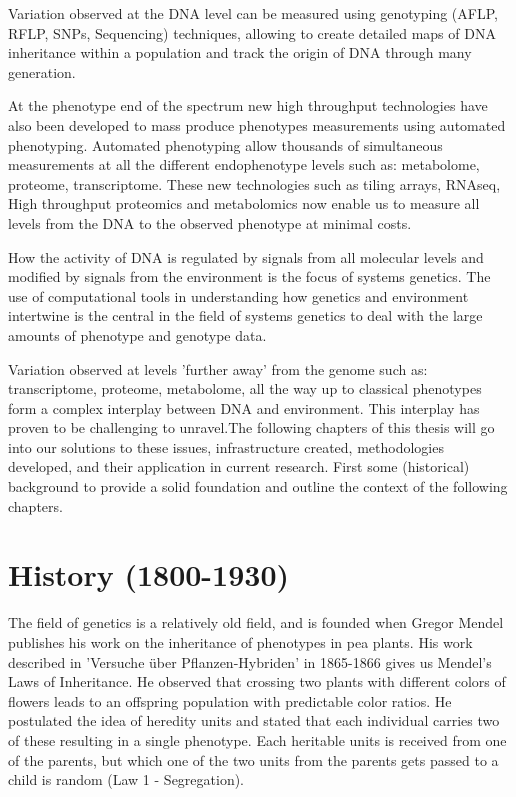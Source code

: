Variation observed at the DNA level can be measured using genotyping (AFLP, RFLP, 
SNPs, Sequencing) techniques, allowing to create detailed maps of DNA inheritance 
within a population and track the origin of DNA through many generation.

At the phenotype end of the spectrum new high throughput technologies have also 
been developed to mass produce phenotypes measurements using automated phenotyping. 
Automated phenotyping allow thousands of simultaneous measurements at all the 
different endophenotype levels such as: metabolome, proteome, transcriptome. These 
new technologies such as tiling arrays, RNAseq, High throughput proteomics and 
metabolomics now enable us to measure all levels from the DNA to the observed 
phenotype at minimal costs.

How the activity of DNA is regulated by signals from all molecular levels and modified by 
signals from the environment is the focus of systems genetics. The use of computational 
tools in understanding how genetics and environment intertwine is the central in the 
field of systems genetics to deal with the large amounts of phenotype and genotype data.

Variation observed at levels 'further away' from the genome such as: transcriptome, 
proteome, metabolome, all the way up to classical phenotypes form a complex interplay 
between DNA and environment. This interplay has proven to be challenging to unravel.The 
following chapters of this thesis will go into our solutions to these issues, 
infrastructure created, methodologies developed, and their application in current 
research. First some (historical) background to provide a solid foundation  and outline
the context of the following chapters.

\section{History (1800-1930)}

The field of genetics is a relatively old field, and is founded when Gregor 
Mendel publishes his work on the inheritance of phenotypes in pea plants. 
His work described in 'Versuche \"uber Pflanzen-Hybriden' in 1865-1866 
\cite{Mendel:1866} gives us Mendel's Laws of Inheritance. He observed that 
crossing two plants with different colors of flowers leads to an offspring 
population with predictable color ratios. He postulated the idea of heredity 
units and stated that each individual carries two of these resulting in a 
single phenotype. Each heritable units is received from one of the parents, 
but which one of the two units from the parents gets passed to a child is random 
(Law 1 - Segregation).

